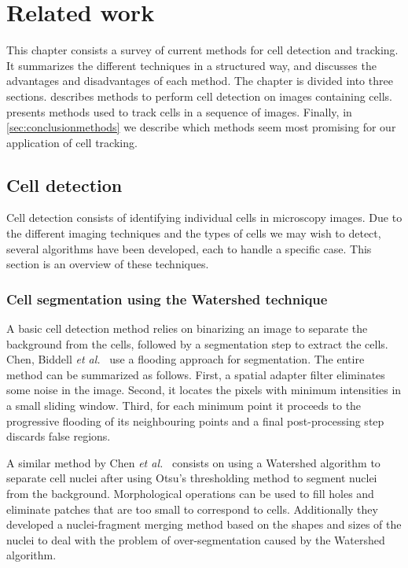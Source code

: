 \chapter{Related work}
\label{chap:relatedwork}
This chapter consists a survey of current methods for cell detection and tracking. It summarizes the different techniques in a structured way, and discusses the advantages and disadvantages of each method. The chapter is divided into three sections.  describes methods to perform cell detection on images containing cells.  presents methods used to track cells in a sequence of images. Finally, in \cref{sec:conclusionmethods} we describe which methods seem most promising for our application of cell tracking. 
	

\section{Cell detection}
\label{sec:detection}
\label{sec:relatedworkdetection}

Cell detection consists of identifying individual cells in microscopy images. Due to the different imaging techniques and the types of cells we may wish to detect, several algorithms have been developed, each to handle a specific case. This section is an overview of these techniques.

\subsection{Cell segmentation using the Watershed technique}

A basic cell detection method relies on binarizing an image to separate the background from the cells, followed by a segmentation step to extract the cells. Chen, Biddell \emph{et al.}~\cite{chen99} use a flooding approach for segmentation. The entire method can be summarized as follows. First, a spatial adapter filter eliminates some noise in the image. Second, it locates the pixels with minimum intensities in a small sliding window. Third, for each minimum point it proceeds to the progressive flooding of its neighbouring points and a final post-processing step discards false regions.

A similar method by Chen \emph{et al.}~\cite{chen06} consists on using a Watershed algorithm \cite{vincent93} to separate cell nuclei after using Otsu's thresholding method to segment nuclei from the background. Morphological operations \cite{serra83} can be used to fill holes and eliminate patches that are too small to correspond to cells. Additionally they developed a nuclei-fragment merging method based on the shapes and sizes of the nuclei to deal with the problem of over-segmentation caused by the Watershed algorithm.

